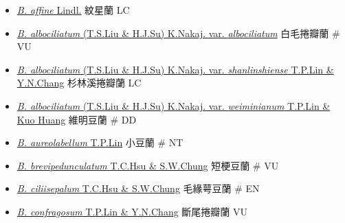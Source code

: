 \begin{itemize}
  \begin{itemize}
        \item[] \href{http://www.theplantlist.org/tpl1.1/search?q=Bulbophyllum+affine}{\textit{B. affine} Lindl.}   紋星蘭   LC
        \item[] \href{http://www.theplantlist.org/tpl1.1/search?q=Bulbophyllum+albociliatum+var.+albociliatum}{\textit{B. albociliatum} (T.S.Liu \& H.J.Su) K.Nakaj. var. \textit{albociliatum}}   白毛捲瓣蘭  \# VU
        \item[] \href{http://www.theplantlist.org/tpl1.1/search?q=Bulbophyllum+albociliatum+var.+shanlinshiense}{\textit{B. albociliatum} (T.S.Liu \& H.J.Su) K.Nakaj. var. \textit{shanlinshiense} T.P.Lin \& Y.N.Chang}   杉林溪捲瓣蘭   LC
        \item[] \href{http://www.theplantlist.org/tpl1.1/search?q=Bulbophyllum+albociliatum+var.+weiminianum}{\textit{B. albociliatum} (T.S.Liu \& H.J.Su) K.Nakaj. var. \textit{weiminianum} T.P.Lin \& Kuo Huang}   維明豆蘭  \# DD
        \item[] \href{http://www.theplantlist.org/tpl1.1/search?q=Bulbophyllum+aureolabellum}{\textit{B. aureolabellum} T.P.Lin}   小豆蘭  \# NT
        \item[] \href{http://www.theplantlist.org/tpl1.1/search?q=Bulbophyllum+brevipedunculatum}{\textit{B. brevipedunculatum} T.C.Hsu \& S.W.Chung}   短梗豆蘭  \# VU
        \item[] \href{http://www.theplantlist.org/tpl1.1/search?q=Bulbophyllum+ciliisepalum}{\textit{B. ciliisepalum} T.C.Hsu \& S.W.Chung}   毛緣萼豆蘭  \# EN
        \item[] \href{http://www.theplantlist.org/tpl1.1/search?q=Bulbophyllum+confragosum}{\textit{B. confragosum} T.P.Lin \& Y.N.Chang}   斷尾捲瓣蘭   VU

\end{itemize}
\end{itemize}
